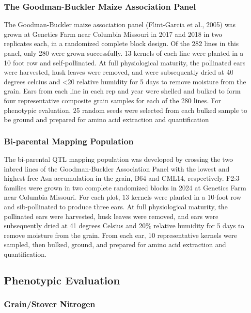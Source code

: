 \subsubsection{The Goodman-Buckler Maize Association Panel}
The Goodman-Buckler maize association panel (Flint-Garcia et al., 2005)  was grown at Genetics Farm near Columbia Missouri in 2017 and 2018 in two replicates each, in a randomized complete block design. Of the 282 lines in this panel, only 280 were grown successfully. 13 kernels of each line were planted in a 10 foot row and self-pollinated. At full physiological maturity, the pollinated ears were harvested, husk leaves were removed, and were subsequently dried at 40 degrees celcius and <20 relative humidity for 5 days to remove moisture from the grain. Ears from each line in each rep and year were shelled and bulked to form four representative composite grain samples for each of the 280 lines. For phenotypic evaluation, 25 random seeds were selected from each bulked sample to be ground and prepared for amino acid extraction and quantification

\subsubsection{Bi-parental Mapping Population}
The bi-parental QTL mapping population was developed by crossing the two inbred lines of the Goodman-Buckler Association Panel with the lowest and highest free Asn accumulation in the grain, B64 and CML14, respectively. F2:3 families were grown in two complete randomized blocks in 2024 at Genetics Farm near Columbia Missouri. For each plot, 13 kernels were planted in a 10-foot row and sib-pollinated to produce three ears. At full physiological maturity, the pollinated ears were harvested, husk leaves were removed, and ears were subsequently dried at 41 degrees Celsius and 20\% relative humidity for 5 days to remove moisture from the grain. From each ear, 10 representative kernels were sampled, then bulked, ground, and prepared for amino acid extraction and quantification.


\subsection{Phenotypic Evaluation}
\subsubsection{Grain/Stover Nitrogen}

